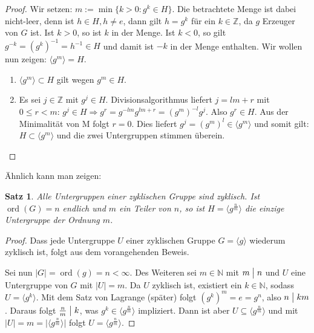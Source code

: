 \documentclass[12pt]{scrartcl} %
\DeclareMathOperator{\ord}{ord}
\newcommand{\inv}[1]{\left(#1\right)^{-1}}
\newcommand{\Inv}[1]{#1^{-1}}
\newcommand{\divides}{\mathrel{\bigm|}}
\newtheorem{thm}{Satz}[section]
\theoremstyle{definition}
\theoremstyle{remark}
\begin{document}
\begin{proof}
	Wir setzen: $m := \min\lbrace k>0 : g^{k} \in H \rbrace$.
	Die betrachtete Menge ist dabei nicht-leer, denn ist $h \in H, h \neq e$, dann gilt $h = g^{k}$ für ein $k\in\mathbb{Z}$, da $g$ Erzeuger von $G$ ist.
	Ist $k>0$, so ist $k$ in der Menge.
	Ist $k<0$, so gilt $g^{-k}=\inv{{g^k}}=\Inv{h}\in H$ und damit ist $-k$ in der Menge enthalten.
	Wir wollen nun zeigen: $\langle g^{m} \rangle = H$.
	\begin{enumerate}
	\item $\langle g^{m} \rangle \subset H$ gilt wegen $g^{m} \in H$.
	\item Es sei $j \in \mathbb{Z}$ mit $g^{j} \in H$. Divisionsalgorithmus liefert $j=lm+r$ mit $0 \leq r < m$: $g^{j} \in H \Rightarrow g^{r}=g^{-lm}g^{lm+r}=(g^{m})^{-l}g^{j}$. Also $g^{r} \in H$. Aus der Minimalität von M folgt $r=0$. Dies liefert $g^{j}=(g^{m})^{l} \in \langle g^{m} \rangle$ und somit gilt: $H \subset \langle g^{m} \rangle$ und die zwei Untergruppen stimmen überein. \qedhere
	\end{enumerate}
\end{proof}

Ähnlich kann man zeigen:

\begin{thm} %
	Alle Untergruppen einer zyklischen Gruppe sind zyklisch.
	Ist $\ord(G)=n$ endlich und $m$ ein Teiler von $n$, so ist $H = \langle g^{\frac{n}{m}}\rangle$ die einzige Untergruppe der Ordnung $m$.
\end{thm}

\begin{proof}
	Dass jede Untergruppe $U$ einer zyklischen Gruppe $G = \langle g \rangle$ wiederum zyklisch ist, folgt aus dem vorangehenden Beweis. 

	Sei nun $\lvert G \rvert = \ord(g) = n < \infty$.
	Des Weiteren sei $m \in \mathbb{N}$ mit $m \divides n$ und $U$ eine Untergruppe von $G$ mit $\lvert U \rvert = m$.
	Da $U$ zyklisch ist, existiert ein $k \in \mathbb{N}$, sodass $U = \langle g^k \rangle$.
	Mit dem Satz von Lagrange (später) folgt $(g^k)^m = e = g^n$, also $n \divides km$.
	Daraus folgt $\frac{n}{m} \divides k$, was $g^k \in \langle g^\frac{n}{m} \rangle$ impliziert.
	Dann ist aber $U \subseteq \langle{g^\frac{n}{m}} \rangle$ und mit $\lvert U \rvert = m = \lvert \langle g^\frac{n}{m} \rangle \rvert$ folgt $U = \langle{g^\frac{n}{m}} \rangle$.
\end{proof}
\end{document}
